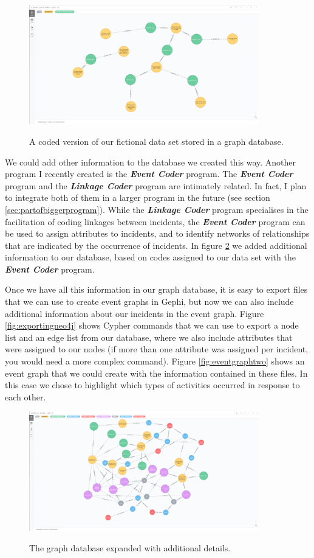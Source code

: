 \documentclass{memoir}
\begin{document}
\begin{figure}[h!]
  \centering
  \caption{A coded version of our fictional data set stored in a graph database.}
  \includegraphics[width=100mm]{Screenshot_17.pdf}
  \label{fig:graphdatabaseexample}
\end{figure}

We could add other information to the database we created this way. Another program I recently created is the \textbf{\emph{Event Coder}} program. The \textbf{\emph{Event Coder}} program and the \textbf{\emph{Linkage Coder}} program are intimately related. In fact, I plan to integrate both of them in a larger program in the future (see section \ref{sec:partofbiggerprogram}). While the \textbf{\emph{Linkage Coder}} program specialises in the facilitation of coding linkages between incidents, the \emph{\textbf{Event Coder}} program can be used to assign attributes to incidents, and to identify networks of relationships that are indicated by the occurrence of incidents. In figure \ref{fig:expandedgraphdatabase} we added additional information to our database, based on codes assigned to our data set with the \textbf{\emph{Event Coder}} program.

Once we have all this information in our graph database, it is easy to export files that we can use to create event graphs in Gephi, but now we can also include additional information about our incidents in the event graph. Figure \ref{fig:exportingneo4j} shows Cypher commands that we can use to export a node list and an edge list from our database, where we also include attributes that were assigned to our nodes (if more than one attribute was assigned per incident, you would need a more complex command). Figure \ref{fig:eventgraphtwo} shows an event graph that we could create with the information contained in these files. In this case we chose to highlight which types of activities occurred in response to each other.

\begin{figure}[h!]
  \centering
  \caption{The graph database expanded with additional details.}
  \includegraphics[width=100mm]{Screenshot_18.pdf}
  \label{fig:expandedgraphdatabase}
\end{figure}
\end{document}

